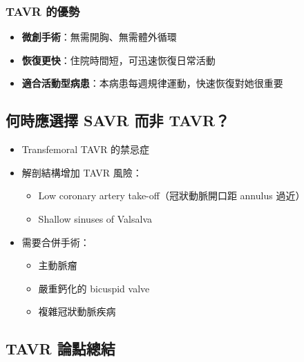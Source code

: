 \documentclass[12pt,a4paper]{article}
\begin{document}

\subsubsection{TAVR 的優勢}

\begin{itemize}[leftmargin=*]
    \item \textbf{微創手術}：無需開胸、無需體外循環
    \item \textbf{恢復更快}：住院時間短，可迅速恢復日常活動
    \item \textbf{適合活動型病患}：本病患每週規律運動，快速恢復對她很重要
\end{itemize}

\subsection{何時應選擇 SAVR 而非 TAVR？}

\begin{itemize}[leftmargin=*]
    \item Transfemoral TAVR 的禁忌症
    \item 解剖結構增加 TAVR 風險：
    \begin{itemize}
        \item Low coronary artery take-off（冠狀動脈開口距 annulus 過近）
        \item Shallow sinuses of Valsalva
    \end{itemize}
    \item 需要合併手術：
    \begin{itemize}
        \item 主動脈瘤
        \item 嚴重鈣化的 bicuspid valve
        \item 複雜冠狀動脈疾病
    \end{itemize}
\end{itemize}

\subsection{TAVR 論點總結}
\end{document}
